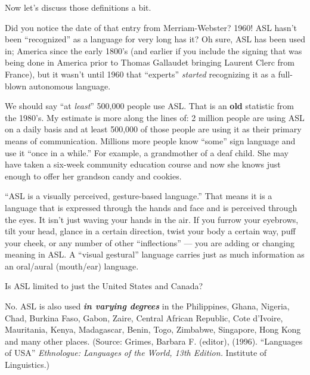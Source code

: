 \documentclass{article}
\begin{document}
Now let's discuss those definitions a bit.

Did you notice the date of that entry from Merriam-Webster?
1960!
ASL hasn't been ``recognized'' as a language for very long has it?
Oh sure, ASL has been used in; America since the early 1800's (and earlier if you include the signing that was being done in America prior to Thomas Gallaudet bringing Laurent Clerc from France), but it wasn't until 1960 that ``experts'' \emph{started} recognizing it as a full-blown autonomous language.

We should say ``at \emph{least}'' 500,000 people use ASL.
That is an \textbf{old} statistic from the 1980's.
My estimate is more along the lines of:
2 million people are using ASL on a daily basis and at least 500,000 of those people are using it as their primary means of communication.
Millions more people know ``some'' sign language and use it ``once in a while.''
For example, a grandmother of a deaf child.
She may have taken a six-week community education course and now she knows just enough to offer her grandson candy and cookies.

``ASL is a visually perceived, gesture-based language.''
That means it is a language that is expressed through the hands and face and is perceived through the eyes.
It isn't just  waving your hands in the air.
If you furrow your eyebrows, tilt your head, glance in a certain direction, twist your body a certain way, puff your cheek, or any number of other ``inflections'' --- you are adding or changing meaning in ASL.
A ``visual gestural'' language carries just as much information as an oral/aural (mouth/ear) language.

Is ASL limited to just the United States and Canada?

No.
ASL is also used \textbf{\emph{in varying degrees}} in the Philippines, Ghana, Nigeria, Chad, Burkina Faso, Gabon, Zaire, Central African Republic, Cote d'Ivoire, Mauritania, Kenya, Madagascar, Benin, Togo, Zimbabwe, Singapore, Hong Kong and many other places.
{\small (Source: Grimes, Barbara F. (editor), (1996). ``Languages of USA'' \emph{Ethnologue: Languages of the World, 13th Edition.} Institute of Linguistics.)}
\end{document}
